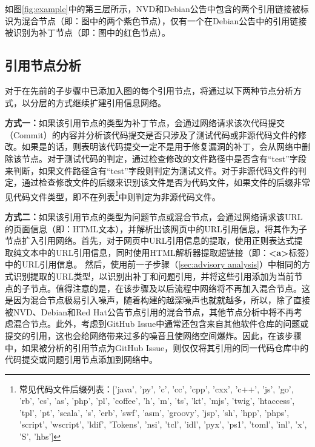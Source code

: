 
\begin{exmp}
如图\ref{fig:example}中的第三层所示，NVD和Debian公告中包含的两个引用链接被标识为混合节点（即：图中的两个紫色节点），仅有一个在Debian公告中的引用链接被识别为补丁节点（即：图中的红色节点）。
\end{exmp}

\subsection{引用节点分析}
对于在先前的子步骤中已添加入图的每个引用节点，\tool 将通过以下两种节点分析方式，以分层的方式继续扩建引用信息网络。%

\textbf{方式一：}如果该引用节点的类型为补丁节点，\tool 会通过网络请求该次代码提交（Commit）的内容并分析该代码提交是否只涉及了测试代码或非源代码文件的修改。如果是的话，则表明该代码提交一定不是用于修复漏洞的补丁，\tool 会从网络中删除该节点。对于测试代码的判定，\tool 通过检查修改的文件路径中是否含有“test”字段来判断，如果文件路径含有“test”字段则判定为测试文件。对于非源代码文件的判定，\tool 通过检查修改文件的后缀来识别该文件是否为代码文件，如果文件的后缀非常见代码文件类型，即不在列表\footnote{常见代码文件后缀列表：['java', 'py', 'c', 'cc', 'cpp', 'cxx', 'c++', 'js', 'go', 'rb', 'cs', 'as', 'php', 'pl', 'coffee', 'h', 'm', 'ts', 'kt', 'mjs', 'twig', 'htaccess', 'tpl', 'pt', 'scala', 's', 'erb', 'swf', 'asm', 'groovy', 'jsp', 'sh', 'hpp', 'phps', 'script', 'wscript', 'ldif', 'Tokens', 'nsi', 'tcl', 'idl', 'pyx', 'ps1', 'toml', 'inl', 'x', 'S', 'hbs']}中则判定为非源代码文件。

\textbf{方式二：}如果该引用节点的类型为问题节点或混合节点，\tool 会通过网络请求该URL的页面信息（即：HTML文本），并解析出该网页中的URL引用信息，将其作为子节点扩入引用网络。首先，对于网页中URL引用信息的提取，\tool 使用正则表达式提取纯文本中的URL引用信息，同时使用HTML解析器提取超链接（即：\textbf{<a>}标签）中的URL引用信息。
然后，使用前一子步骤（\ref{sec:advisory analysis}）中相同的方式识别提取的URL类型，以识别出补丁和问题引用，并将这些引用添加为当前节点的子节点。值得注意的是，在该步骤及以后流程中网络将不再加入混合节点。这是因为混合节点极易引入噪声，随着构建的越深噪声也就就越多，所以，除了直接被NVD、Debian和Red Hat公告节点引用的混合节点，其他节点分析中将不再考虑混合节点。此外，考虑到GitHub Issue中通常还包含来自其他软件仓库的问题或提交的引用，这也会给网络带来过多的噪音且使网络空间爆炸。因此，在该步骤中，如果被分析的引用节点为GitHub Issue，则仅仅将其引用的同一代码仓库中的代码提交或问题引用节点添加到网络中。

